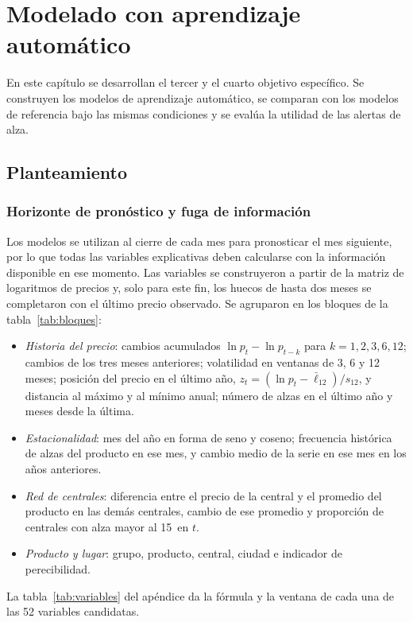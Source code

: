 \chapter{Modelado con aprendizaje automático}
\label{cap:ml}

En este capítulo se desarrollan el tercer y el cuarto objetivo específico. Se construyen los modelos de aprendizaje automático, se comparan con los modelos de referencia bajo las mismas condiciones y se evalúa la utilidad de las alertas de alza.

\section{Planteamiento}
\label{sec:planteamiento}

\subsection{Horizonte de pronóstico y fuga de información}
\label{sec:fuga}

Los modelos se utilizan al cierre de cada mes para pronosticar el mes siguiente, por lo que todas las variables explicativas deben calcularse con la información disponible en ese momento. Las variables se construyeron a partir de la matriz de logaritmos de precios y, solo para este fin, los huecos de hasta dos meses se completaron con el último precio observado. Se agruparon en los bloques de la tabla~\ref{tab:bloques}:
\begin{itemize}[nosep]
\item \emph{Historia del precio}: cambios acumulados $\ln p_t-\ln p_{t-k}$ para $k=1,2,3,6,12$; cambios de los tres meses anteriores; volatilidad en ventanas de 3, 6 y 12 meses; posición del precio en el último año, $z_t=(\ln p_t-\bar\ell_{12})/s_{12}$, y distancia al máximo y al mínimo anual; número de alzas en el último año y meses desde la última.
\item \emph{Estacionalidad}: mes del año en forma de seno y coseno; frecuencia histórica de alzas del producto en ese mes, y cambio medio de la serie en ese mes en los años anteriores.
\item \emph{Red de centrales}: diferencia entre el precio de la central y el promedio del producto en las demás centrales, cambio de ese promedio y proporción de centrales con alza mayor al 15\pct\ en $t$.
\item \emph{Producto y lugar}: grupo, producto, central, ciudad e indicador de perecibilidad.
\end{itemize}
La tabla~\ref{tab:variables} del apéndice da la fórmula y la ventana de cada una de las 52 variables candidatas.


